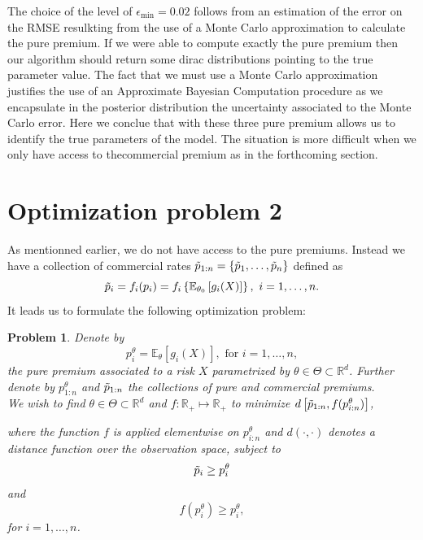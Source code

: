 \documentclass[10pt]{article}
\newtheorem{pb}{Problem}
\begin{document}
The choice of the level of $\epsilon_{\min} = 0.02$ follows from an estimation of the error on the RMSE resulkting from the use of a Monte Carlo approximation to calculate the pure premium. If we were able to compute exactly the pure premium then our algorithm should return some dirac distributions pointing to the true parameter value. The fact that we must use a Monte Carlo approximation justifies the use of an Approximate Bayesian Computation procedure as we encapsulate in the posterior distribution the uncertainty associated to the Monte Carlo error. Here we conclue that with these three pure premium allows us to identify the true parameters of the model. The situation is more difficult when we only have access to thecommercial premium as in the forthcoming section.
\section{Optimization problem 2}\label{sec:problem2}

As mentionned earlier, we do not have access to the pure premiums. Instead we have a collection of commercial rates $\Tilde{p}_{1:n} = \{\Tilde{p}_{1},\ldots, \Tilde{p}_{n}\}$ defined as
$$
\Tilde{p}_i = f_i(p_i) = f_i\left\{\mathbb{E}_{\theta_0}\left[g_{i}(X)\right]\right\},\text{ }i = 1,\ldots, n.
$$
It leads us to formulate the following optimization problem: 
\begin{pb}\label{pb:optimization_problem}
Denote by 
$$
p_i^\theta =\mathbb{E}_\theta\left[g_{i}(X)\right],\text{ for }i = 1,\ldots, n,
$$
the pure premium associated to a risk $X$ parametrized by $\theta\in \Theta\subset\mathbb{R}^d$. Further denote by $p^\theta_{1:n}$ and $\Tilde{p}_{1:n}$ the collections of pure and commercial premiums. \\

We wish to find $\theta\in \Theta\subset\mathbb{R}^d$ and $f:\mathbb{R}_+\mapsto \mathbb{R}_+$ to minimize \(d\left[\Tilde{p}_{1:n}, f(p_{i:n}^\theta)\right]\),

where the function $f$ is applied elementwise  on $p_{i:n}^\theta$ and $d(\cdot, \cdot)$ denotes a distance function over the observation space,
subject to 
\begin{equation}\label{eq:constraint1}
\Tilde{p}_i \geq p_i^\theta
\end{equation}
and 
\begin{equation}\label{eq:constraint2}
f(p_i^\theta) \geq p_i^\theta, 
\end{equation}
for $i = 1,\ldots, n$. 
\end{pb}
\end{document}

